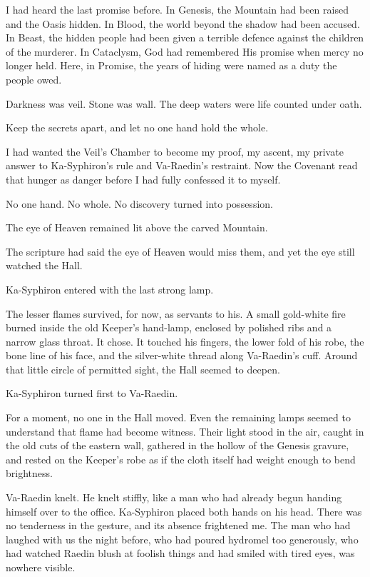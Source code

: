 I had heard the last promise before.
In Genesis, the Mountain had been raised and the Oasis hidden.
In Blood, the world beyond the shadow had been accused.
In Beast, the hidden people had been given a terrible defence against the children of the murderer.
In Cataclysm, God had remembered His promise when mercy no longer held.
Here, in Promise, the years of hiding were named as a duty the people owed.\par
Darkness was veil.
Stone was wall.
The deep waters were life counted under oath.\par
Keep the secrets apart, and let no one hand hold the whole.\par
I had wanted the Veil's Chamber to become my proof, my ascent, my private answer to Ka-Syphiron's rule and Va-Raedin's restraint.
Now the Covenant read that hunger as danger before I had fully confessed it to myself.\par
No one hand.
No whole.
No discovery turned into possession.\par
The eye of Heaven remained lit above the carved Mountain.\par
The scripture had said the eye of Heaven would miss them, and yet the eye still watched the Hall.\par
Ka-Syphiron entered with the last strong lamp.\par
The lesser flames survived, for now, as servants to his.
A small gold-white fire burned inside the old Keeper's hand-lamp, enclosed by polished ribs and a narrow glass throat.
It chose.
It touched his fingers, the lower fold of his robe, the bone line of his face, and the silver-white thread along Va-Raedin's cuff.
Around that little circle of permitted sight, the Hall seemed to deepen.\par
Ka-Syphiron turned first to Va-Raedin.\par
For a moment, no one in the Hall moved.
Even the remaining lamps seemed to understand that flame had become witness.
Their light stood in the air, caught in the old cuts of the eastern wall, gathered in the hollow of the Genesis gravure, and rested on the Keeper's robe as if the cloth itself had weight enough to bend brightness.\par
Va-Raedin knelt.
He knelt stiffly, like a man who had already begun handing himself over to the office.
Ka-Syphiron placed both hands on his head.
There was no tenderness in the gesture, and its absence frightened me.
The man who had laughed with us the night before, who had poured hydromel too generously, who had watched Raedin blush at foolish things and had smiled with tired eyes, was nowhere visible.
